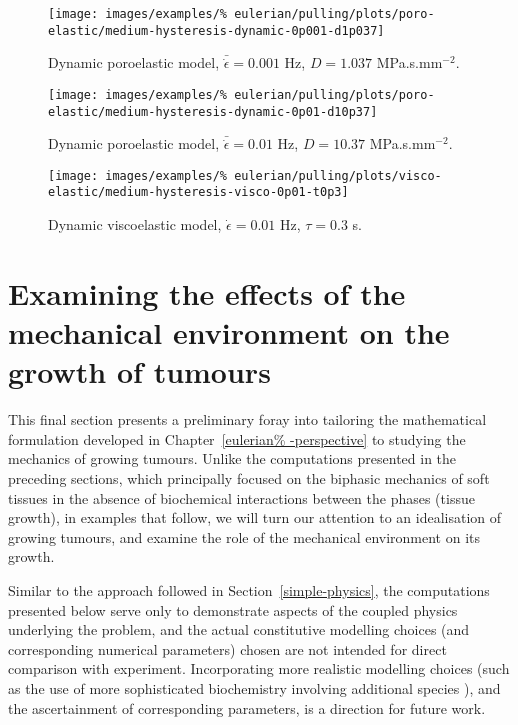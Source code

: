 \begin{figure}[!hptb]
\centering
\texttt{[image: images/examples/\%
eulerian/pulling/plots/poro-elastic/medium-hysteresis-dynamic-0p001-d1p037]}
\caption{Dynamic poroelastic model, $\bar{\dot{\epsilon}}=0.001$ Hz,
  $D=1.037$ MPa.s.mm$^{-2}$.}
\label{medium-hysteresis-dynamic-0p001-d1p037}
\end{figure}

\begin{figure}[!hptb]
\centering
\texttt{[image: images/examples/\%
eulerian/pulling/plots/poro-elastic/medium-hysteresis-dynamic-0p01-d10p37]}
\caption{Dynamic poroelastic model, $\bar{\dot{\epsilon}}=0.01$ Hz,
  $D=10.37$ MPa.s.mm$^{-2}$.}
\label{medium-hysteresis-dynamic-0p01-d10p37}
\end{figure}

\begin{figure}[!hptb]
\centering
\texttt{[image: images/examples/\%
eulerian/pulling/plots/visco-elastic/medium-hysteresis-visco-0p01-t0p3]}
\caption{Dynamic viscoelastic model, $\dot{\epsilon}=0.01$ Hz,
  $\tau=0.3$ s.}
\label{medium-hysteresis-visco-0p01-t0p3}
\end{figure}

\section{Examining the effects of the mechanical environment on the
  growth of tumours}
\label{tumour-growth}

This final section presents a preliminary foray into tailoring the
mathematical formulation developed in Chapter~\ref{eulerian%
  -perspective} to studying the mechanics of growing tumours. Unlike
the computations presented in the preceding sections, which
principally focused on the biphasic mechanics of soft tissues in the
absence of biochemical interactions between the phases (tissue
growth), in examples that follow, we will turn our attention to an
idealisation of growing tumours, and examine the role of the
mechanical environment on its growth.

Similar to the approach followed in Section~\ref{simple-physics}, the
computations presented below serve only to demonstrate aspects of the
coupled physics underlying the problem, and the actual constitutive
modelling choices (and corresponding numerical parameters) chosen are
not intended for direct comparison with experiment. Incorporating more
realistic modelling choices (such as the use of more sophisticated
biochemistry involving additional species \citep{tjacks2000}), and the
ascertainment of corresponding parameters, is a direction for future
work.

